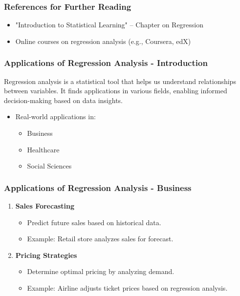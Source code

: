 \documentclass{beamer}
\begin{document}
\begin{frame}[fragile]
    \frametitle{References for Further Reading}
    \begin{itemize}
        \item "Introduction to Statistical Learning" – Chapter on Regression
        \item Online courses on regression analysis (e.g., Coursera, edX)
    \end{itemize}
\end{frame}

\begin{frame}[fragile]
    \frametitle{Applications of Regression Analysis - Introduction}
    Regression analysis is a statistical tool that helps us understand relationships between variables. It finds applications in various fields, enabling informed decision-making based on data insights. 
    \begin{itemize}
        \item Real-world applications in:
        \begin{itemize}
            \item Business
            \item Healthcare
            \item Social Sciences
        \end{itemize}
    \end{itemize}
\end{frame}

\begin{frame}[fragile]
    \frametitle{Applications of Regression Analysis - Business}
    \begin{enumerate}
        \item \textbf{Sales Forecasting} 
            \begin{itemize}
                \item Predict future sales based on historical data.
                \item Example: Retail store analyzes sales for forecast.
            \end{itemize}

        \item \textbf{Pricing Strategies}
            \begin{itemize}
                \item Determine optimal pricing by analyzing demand.
                \item Example: Airline adjusts ticket prices based on regression analysis.
            \end{itemize}
    \end{enumerate}
\end{frame}
\end{document}
